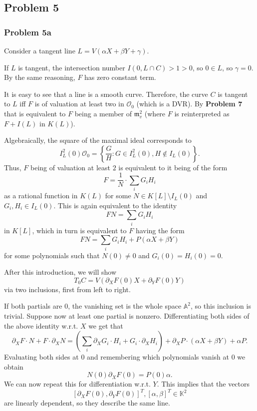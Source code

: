 \subsection*{Problem 5}

\subsubsection*{Problem 5a}

Consider a tangent line 
\( L = V(\alpha X + \beta Y + \gamma )\).

If \( L \) is tangent, the intersection number \( I(0, L \cap C)  > 1 > 0 \),
so \( 0 \in L \), so \( \gamma = 0 \). By the same reasoning, \( F \) has zero
constant term.

It is easy to see that a line is a smooth curve. Therefore, the curve \( C \)
is tangent to \( L \) iff \( F \) is of valuation at least two in \( \mathcal{O}_0 \)
(which is a DVR). By {\bf Problem 7} that is equivalent to \( F \) being a 
member of \( \mathfrak{m}^2_v \) (where \( F \) is reinterpreted
as \( F + I(L) \) in \( K(L) \)).

Algebraically, the square of the maximal ideal corresponds to
\[ 
    I^2_L(0) \mathcal{O}_0 = \left\{ \frac{G}{H} : G \in I^2_L(0), H \not\in I_L(0)\right \} .
\]
Thus, \( F \) being of valuation at least \( 2 \) is equivalent to it being of the form
\[ 
    F = \frac{1}{N} \cdot \sum_i G_i H_i  
\]
as a rational function in \( K(L) \) for some \( N \in K[L] \setminus I_L(0)\)
and \( G_i, H_i \in I_L(0) \). This is again equivalent to the identity
\[ 
    FN = \sum_i G_i H_i 
\]
in \( K[L] \), which in turn is equivalent to \( F \) having the form
\[ 
    FN = \sum_i G_i H_i + P(\alpha X + \beta Y)
\]
for some polynomials such that \( N(0) \neq 0 \) and \( G_i (0) = H_i(0) = 0 \).

After this introduction, we will show
\[ 
    T_0 C = V\left( \partial_X F (0) X + \partial_Y F(0) Y \right) 
\]
via two inclusions, first from left to right.

If both partials are \( 0 \), the vanishing set is the whole space \( \mathbb{A}^2 \),
so this inclusion is trivial. Suppose now at least one partial is nonzero.
Differentiating both sides of the above identity w.r.t. \( X \) we get that
\[ 
    \partial_X F \cdot N + F \cdot \partial_X N = \left( \sum_i \partial_X G_i \cdot H_i
    + G_i \cdot \partial_X H_i \right ) + \partial_X P \cdot (\alpha X + \beta Y) + \alpha P.
\]
Evaluating both sides at \( 0 \) and remembering which polynomials vanish at \( 0 \)
we obtain
\[ 
    N(0) \partial_X F (0) = P(0) \alpha.
\]
We can now repeat this for differentiation w.r.t. \( Y \). This implies that the
vectors
\[ 
    [ \partial_X F(0), \partial_Y F(0) ]^T, [ \alpha, \beta ]^T \in \mathbb{K}^2
\]
are linearly dependent, so they describe the same line.

